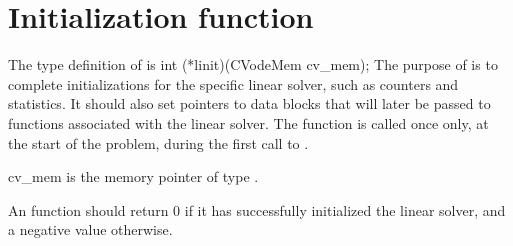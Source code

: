 
\section{Initialization function}
The type definition of  is
{
  int (*linit)(CVodeMem cv\_mem);
}
{
  The purpose of  is to complete initializations for
  the specific linear solver, such as counters and statistics.
  It should also set pointers to data blocks that will later be
  passed to functions associated with the linear solver.
  The  function is called once only, at the start of
  the problem, during the first call to .
}
{
  \begin{args}[cv\_mem]
  \item[cv\_mem]
    is the {\cvodes} memory pointer of type .
  \end{args}
}
{
  An  function should return 0 if it 
  has successfully initialized the {\cvodes} linear solver, and 
  a negative value otherwise. 
}
{}


